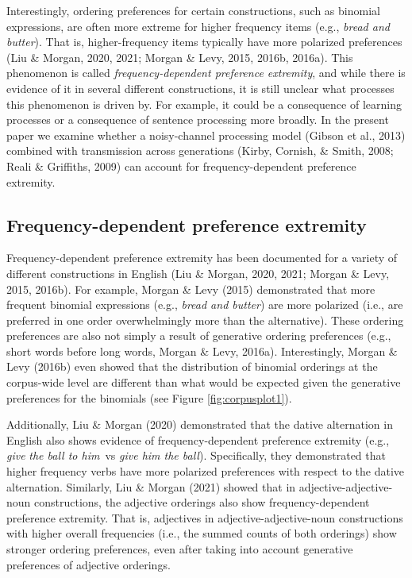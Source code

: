 \documentclass[10pt, letterpaper]{article}
\begin{document}
Interestingly, ordering preferences for certain constructions, such as
binomial expressions, are often more extreme for higher frequency items
(e.g., \emph{bread and butter}). That is, higher-frequency items
typically have more polarized preferences (Liu \& Morgan, 2020, 2021;
Morgan \& Levy, 2015, 2016b, 2016a). This phenomenon is called
\emph{frequency-dependent preference extremity}, and while there is
evidence of it in several different constructions, it is still unclear
what processes this phenomenon is driven by. For example, it could be a
consequence of learning processes or a consequence of sentence
processing more broadly. In the present paper we examine whether a
noisy-channel processing model (Gibson et al., 2013) combined with
transmission across generations (Kirby, Cornish, \& Smith, 2008; Reali
\& Griffiths, 2009) can account for frequency-dependent preference
extremity.

\hypertarget{frequency-dependent-preference-extremity}{%
\subsection{Frequency-dependent preference
extremity}\label{frequency-dependent-preference-extremity}}

Frequency-dependent preference extremity has been documented for a
variety of different constructions in English (Liu \& Morgan, 2020,
2021; Morgan \& Levy, 2015, 2016b). For example, Morgan \& Levy (2015)
demonstrated that more frequent binomial expressions (e.g., \emph{bread
and butter}) are more polarized (i.e., are preferred in one order
overwhelmingly more than the alternative). These ordering preferences
are also not simply a result of generative ordering preferences (e.g.,
short words before long words, Morgan \& Levy, 2016a). Interestingly,
Morgan \& Levy (2016b) even showed that the distribution of binomial
orderings at the corpus-wide level are different than what would be
expected given the generative preferences for the binomials (see Figure
\ref{fig:corpusplot1}).

Additionally, Liu \& Morgan (2020) demonstrated that the dative
alternation in English also shows evidence of frequency-dependent
preference extremity (e.g., \emph{give} \emph{the ball to him}~vs
\emph{give him the ball}). Specifically, they demonstrated that higher
frequency verbs have more polarized preferences with respect to the
dative alternation. Similarly, Liu \& Morgan (2021) showed that in
adjective-adjective-noun constructions, the adjective orderings also
show frequency-dependent preference extremity. That is, adjectives in
adjective-adjective-noun constructions with higher overall frequencies
(i.e., the summed counts of both orderings) show stronger ordering
preferences, even after taking into account generative preferences of
adjective orderings.
\end{document}
